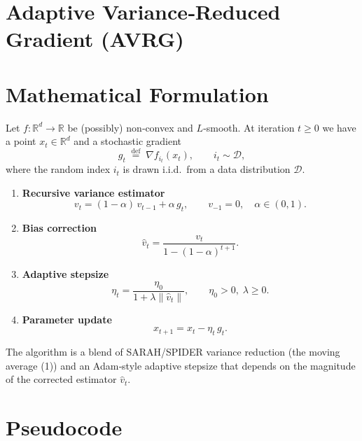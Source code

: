 \documentclass{article}
\newcommand{\R}{\mathbb{R}}
\newcommand{\norm}[1]{\left\|#1\right\|}
\newcommand{\grad}{\nabla}
\begin{document}
\section*{Adaptive Variance‑Reduced Gradient (AVRG)}

\section*{Mathematical Formulation}
Let $f:\R^{d}\rightarrow\R$ be (possibly) non‑convex and $L$‑smooth.  
At iteration $t\ge 0$ we have a point $x_{t}\in\R^{d}$ and a stochastic gradient
\[
g_{t}\;\stackrel{\text{def}}{=}\;\grad f_{i_t}(x_{t}),\qquad i_t\sim\mathcal{D},
\]
where the random index $i_t$ is drawn i.i.d.\ from a data distribution $\mathcal D$.

\begin{enumerate}[label=\arabic*)]
\item \textbf{Recursive variance estimator}
\[
v_{t}= (1-\alpha)\,v_{t-1}+ \alpha\,g_{t},\qquad v_{-1}=0,\quad \alpha\in(0,1).
\tag{1}
\]

\item \textbf{Bias correction}
\[
\hat v_{t}= \frac{v_{t}}{1-(1-\alpha)^{t+1}} .
\tag{2}
\]

\item \textbf{Adaptive stepsize}
\[
\eta_{t}= \frac{\eta_{0}}{1+\lambda \norm{\hat v_{t}}},\qquad 
\eta_{0}>0,\;\lambda\ge 0 .
\tag{3}
\]

\item \textbf{Parameter update}
\[
x_{t+1}= x_{t}-\eta_{t}\,g_{t}.
\tag{4}
\]
\end{enumerate}

The algorithm is a blend of SARAH/SPIDER variance reduction (the moving average
(1)) and an Adam‑style adaptive stepsize that depends on the magnitude of the
corrected estimator $\hat v_{t}$.

\section*{Pseudocode}
\begin{algorithm}[H]
\caption{Adaptive Variance‑Reduced Gradient (AVRG)}
\begin{algorithmic}[1]
\STATE \textbf{Input:} $x_{0}$, stepsize base $\eta_{0}>0$, 
       decay $\alpha\in(0,1)$, adaptation coeff.\ $\lambda\ge0$, 
       max‐iter $T$.
\STATE $v_{-1}\gets 0$
    \STATE Sample $i_{t}\sim\mathcal D$ and compute $g_{t}= \grad f_{i_{t}}(x_{t})$
    \STATE $v_{t}\gets (1-\alpha)v_{t-1}+ \alpha g_{t}$ \hfill\textbf{(variance estimator)}
    \STATE $\hat v_{t}\gets v_{t}/\bigl(1-(1-\alpha)^{t+1}\bigr)$ \hfill\textbf{(bias correction)}
    \STATE $\eta_{t}\gets \dfrac{\eta_{0}}{1+\lambda \norm{\hat v_{t}}}}$ \hfill\textbf{(adaptive stepsize)}
    \STATE $x_{t+1}\gets x_{t}-\eta_{t} g_{t}$ \hfill\textbf{(parameter update)}
\ENDFOR
\STATE \textbf{Return} $x_{T}$
\end{algorithmic}
\end{algorithm}
\end{document}
